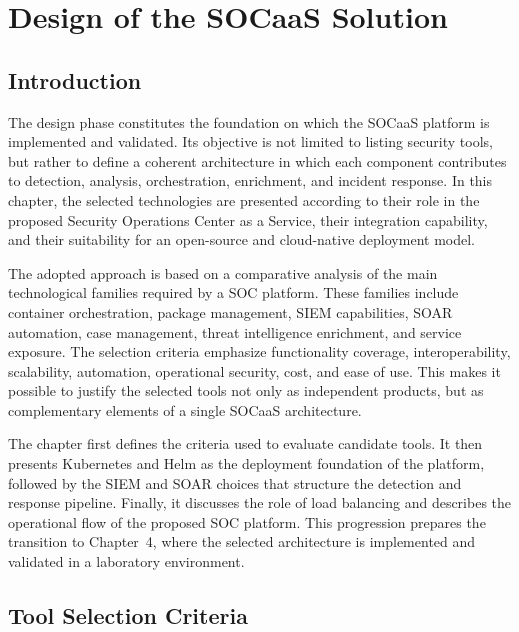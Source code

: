 \setcounter{chapter}{2}
\chapter{Design of the SOCaaS Solution}
\label{chap:design}

\section{Introduction}
\label{sec:ch3-intro}

The design phase constitutes the foundation on which the SOCaaS platform is implemented and validated. Its objective is not limited to listing security tools, but rather to define a coherent architecture in which each component contributes to detection, analysis, orchestration, enrichment, and incident response. In this chapter, the selected technologies are presented according to their role in the proposed Security Operations Center as a Service, their integration capability, and their suitability for an open-source and cloud-native deployment model.

The adopted approach is based on a comparative analysis of the main technological families required by a SOC platform. These families include container orchestration, package management, SIEM capabilities, SOAR automation, case management, threat intelligence enrichment, and service exposure. The selection criteria emphasize functionality coverage, interoperability, scalability, automation, operational security, cost, and ease of use. This makes it possible to justify the selected tools not only as independent products, but as complementary elements of a single SOCaaS architecture.

The chapter first defines the criteria used to evaluate candidate tools. It then presents Kubernetes and Helm as the deployment foundation of the platform, followed by the SIEM and SOAR choices that structure the detection and response pipeline. Finally, it discusses the role of load balancing and describes the operational flow of the proposed SOC platform. This progression prepares the transition to Chapter~4, where the selected architecture is implemented and validated in a laboratory environment.

\section{Tool Selection Criteria}
\label{sec:criteria}


